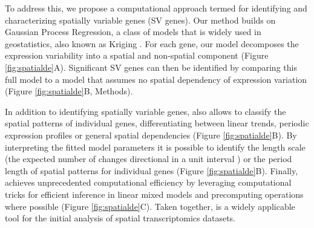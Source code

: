 To address this, we propose a computational approach termed  for identifying and characterizing spatially variable genes (SV genes). Our method builds on Gaussian Process Regression, a class of models that is widely used in geostatistics, also known as Kriging \cite{Williams2006-kb}. For each gene, our model decomposes the expression variability into a spatial and non-spatial component (Figure \ref{fig:spatialde}A). Significant SV genes can then be identified by comparing this full model to a model that assumes no spatial dependency of expression variation (Figure \ref{fig:spatialde}B, Methods).

In addition to identifying spatially variable genes,  also allows to classify the spatial patterns of individual genes, differentiating between linear trends, periodic expression profiles or general spatial dependencies (Figure \ref{fig:spatialde}B). By interpreting the fitted model parameters it is possible to identify the length scale (the expected number of changes directional in a unit interval \cite{Williams2006-kb}) or the period length of spatial patterns for individual genes (Figure \ref{fig:spatialde}B). Finally,  achieves unprecedented computational efficiency by leveraging computational tricks for efficient inference in linear mixed models \cite{Lippert2011-fm} and precomputing operations where possible (Figure \ref{fig:spatialde}C). Taken together,  is a widely applicable tool for the initial analysis of spatial transcriptomics datasets.

